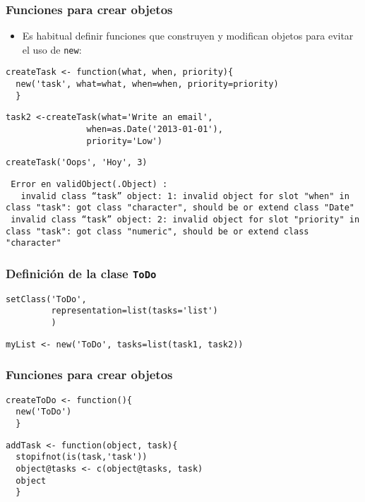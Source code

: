 \documentclass[xcolor={usenames,svgnames,dvipsnames}]{beamer}
\begin{document}
\begin{frame}[fragile]
\frametitle{Funciones para crear objetos}
\label{sec-3-1-4}

\begin{itemize}
\item Es habitual definir funciones que construyen y modifican objetos
  para evitar el uso de \texttt{new}:
\end{itemize}

\lstset{language=R}
\begin{lstlisting}
createTask <- function(what, when, priority){
  new('task', what=what, when=when, priority=priority)
  }
\end{lstlisting}



\lstset{language=R}
\begin{lstlisting}
task2 <-createTask(what='Write an email',
                when=as.Date('2013-01-01'),
                priority='Low')
\end{lstlisting}



\lstset{language=R}
\begin{lstlisting}
createTask('Oops', 'Hoy', 3)
\end{lstlisting}

\begin{verbatim}
 Error en validObject(.Object) : 
   invalid class “task” object: 1: invalid object for slot "when" in class "task": got class "character", should be or extend class "Date"
 invalid class “task” object: 2: invalid object for slot "priority" in class "task": got class "numeric", should be or extend class "character"
\end{verbatim}
\end{frame}
\begin{frame}[fragile]
\frametitle{Definición de la clase \texttt{ToDo}}
\label{sec-3-1-5}


\lstset{language=R}
\begin{lstlisting}
setClass('ToDo',
         representation=list(tasks='list')
         )
\end{lstlisting}



\lstset{language=R}
\begin{lstlisting}
myList <- new('ToDo', tasks=list(task1, task2))
\end{lstlisting}
\end{frame}
\begin{frame}[fragile]
\frametitle{Funciones para crear objetos}
\label{sec-3-1-6}


\lstset{language=R}
\begin{lstlisting}
createToDo <- function(){
  new('ToDo')
  }
\end{lstlisting}



\lstset{language=R}
\begin{lstlisting}
addTask <- function(object, task){
  stopifnot(is(task,'task'))
  object@tasks <- c(object@tasks, task)
  object
  }
\end{lstlisting}
\end{frame}
\end{document}
